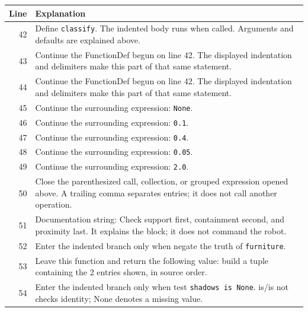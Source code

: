 \documentclass[11pt,a4paper]{book}
\begin{document}
\begin{longtable}{r p{}}

\textbf{Line} & \textbf{Explanation} \\ \hline \endhead

42 & Define \texttt{classify}. The indented body runs when called. Arguments and defaults are explained above. \\

43 & Continue the FunctionDef begun on line 42. The displayed indentation and delimiters make this part of that same statement. \\

44 & Continue the FunctionDef begun on line 42. The displayed indentation and delimiters make this part of that same statement. \\

45 & Continue the surrounding expression: \texttt{None}. \\

46 & Continue the surrounding expression: \texttt{0.1}. \\

47 & Continue the surrounding expression: \texttt{0.4}. \\

48 & Continue the surrounding expression: \texttt{0.05}. \\

49 & Continue the surrounding expression: \texttt{2.0}. \\

50 & Close the parenthesized call, collection, or grouped expression opened above. A trailing comma separates entries; it does not call another operation. \\

51 & Documentation string: Check support first, containment second, and proximity last. It explains the block; it does not command the robot. \\

52 & Enter the indented branch only when negate the truth of \texttt{furniture}. \\

53 & Leave this function and return the following value: build a tuple containing the 2 entries shown, in source order. \\

54 & Enter the indented branch only when test \texttt{shadows is None}. is/is not checks identity; None denotes a missing value. \\


\end{longtable}
\end{document}
